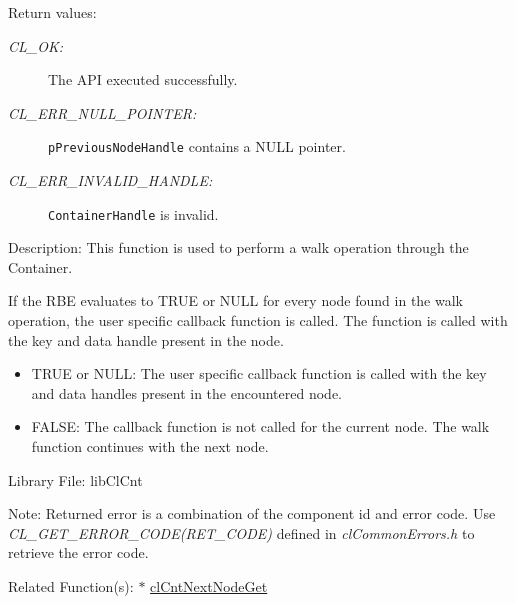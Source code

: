 \begin{Desc}
\item[Return values:]
\begin{description}
\item[{\em CL\_\-OK:}]The API executed successfully. 
\item[{\em CL\_\-ERR\_\-NULL\_\-POINTER:}]{\tt{pPreviousNodeHandle}} contains a NULL pointer. 
\item[{\em CL\_\-ERR\_\-INVALID\_\-HANDLE:}]{\tt{ContainerHandle}} is invalid.
\end{description}
\end{Desc}
\begin{Desc}
\item[Description:]This function is used to perform a walk operation through the Container. 

If the RBE evaluates to TRUE or NULL for every node found in the walk operation, the user specific callback function is called. The function is called 
with the key and data handle present in the node.

 \par
 \begin{itemize}
\item TRUE or NULL: The user specific callback function is called with the key and data handles present in the encountered node. 
\item FALSE: The callback function is not called for the current node. The walk function continues with the next node.\end{itemize}
\end{Desc}
\begin{Desc}
\item[Library File:]lib\-Cl\-Cnt\end{Desc}
\begin{Desc}
\item[Note:]Returned error is a combination of the component id and error code. Use \textit{CL\_\-GET\_\-ERROR\_\-CODE(RET\_\-CODE)} defined in \textit{clCommonErrors.h} to retrieve the error code.\end{Desc}
\begin{Desc}
\item[Related Function(s):]$\ast$ \hyperlink{pagecnt112}{cl\-Cnt\-Next\-Node\-Get} \end{Desc}


\newpage
